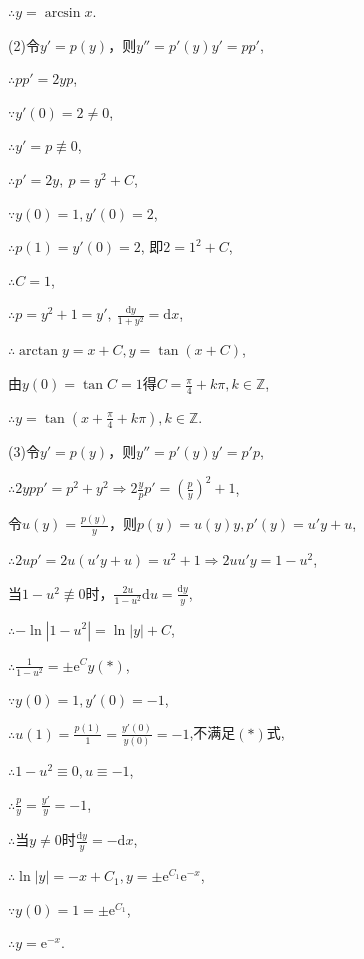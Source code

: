 \documentclass[12pt,UTF8]{ctexart}
\newcommand{\md}[1]{\mathrm d#1}
\newcommand{\me}[0]{\mathrm e}
\begin{document}
\begin{enumerate}
$\therefore y=\arcsin x$.

(2)令$y'=p(y)$，则$y''=p'(y)y'=pp'$,

$\therefore pp'=2yp$,

$\because y'(0)=2\neq0$,

$\therefore y'=p\not\equiv0$,

$\therefore p'=2y,\ p=y^2+C$,

$\because y(0)=1,y'(0)=2$,

$\therefore p(1)=y'(0)=2$, 即$2=1^2+C$,

$\therefore C=1$,

$\therefore p=y^2+1=y',\ \frac{\md y}{1+y^2}=\md x$,

$\therefore\arctan y=x+C, y=\tan(x+C)$,

由$y(0)=\tan C=1$得$C=\frac\pi4+k\pi,k\in\mathbb Z$,

$\therefore y=\tan(x+\frac\pi4+k\pi),k\in\mathbb Z$.

(3)令$y'=p(y)$，则$y''=p'(y)y'=p'p$,

$\therefore 2ypp'=p^2+y^2\Rightarrow 2\frac ypp'=(\frac py)^2+1$,

令$u(y)=\frac{p(y)}y$，则$p(y)=u(y)y,p'(y)=u'y+u$,

$\therefore2up'=2u(u'y+u)=u^2+1\Rightarrow 2uu'y=1-u^2$,

当$1-u^2\not\equiv0$时，$\frac{2u}{1-u^2}\mathrm du=\frac{\md y}y$,

$\therefore-\ln|1-u^2|=\ln|y|+C$,

$\therefore\frac1{1-u^2}=\pm\me^Cy(*)$,

$\because y(0)=1,y'(0)=-1$,

$\therefore u(1)=\frac{p(1)}1=\frac{y'(0)}{y(0)}=-1$,不满足$(*)$式,

$\therefore1-u^2\equiv0,u\equiv-1$,

$\therefore\frac py=\frac{y'}y=-1$,

$\therefore$当$y\neq0$时$\frac{\md y}{y}=-\md x$,

$\therefore\ln|y|=-x+C_1,y=\pm\me^{C_1}\me^{-x}$,

$\because y(0)=1=\pm\me^{C_1}$,

$\therefore y=\me^{-x}$.

%
%
%
%
%
%
%
%
%
%
%
%
%
%
%
%
%
%


\end{enumerate}
\end{document}
